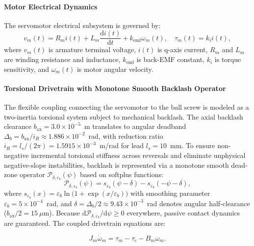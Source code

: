 \documentclass[a4paper,fleqn]{cas-dc}
\begin{document}
\paragraph{Motor Electrical Dynamics}
The servomotor electrical subsystem is governed by:
\begin{equation}
    v_m(t) = R_m i(t) + L_m \frac{\mathrm{d}i(t)}{\mathrm{d}t} + k_{\mathrm{emf}} \omega_m(t), \quad \tau_m(t) = k_i i(t),
    \label{eq:elec_dynamics}
\end{equation}
where $v_m(t)$ is armature terminal voltage, $i(t)$ is q-axis current, $R_m$ and $L_m$ are winding resistance and inductance, $k_{\mathrm{emf}}$ is back-EMF constant, $k_i$ is torque sensitivity, and $\omega_m(t)$ is motor angular velocity.

\paragraph{Torsional Drivetrain with Monotone Smooth Backlash Operator}
The flexible coupling connecting the servomotor to the ball screw is modeled as a two-inertia torsional system subject to mechanical backlash. The axial backlash clearance $b_{\mathrm{ax}} = 3.0 \times 10^{-5}$~m translates to angular deadband $\Delta_b = b_{\mathrm{ax}} / i_R \approx 1.886 \times 10^{-2}$~rad, with reduction ratio $i_R = l_s / (2\pi) = 1.5915 \times 10^{-3}$~m/rad for lead $l_s = 10$~mm. To ensure non-negative incremental torsional stiffness across reversals and eliminate unphysical negative-slope instabilities, backlash is represented via a monotone smooth dead-zone operator $\mathcal{P}_{\delta,\varepsilon_b}(\psi)$ based on softplus functions:
\begin{equation}
    \mathcal{P}_{\delta,\varepsilon_b}(\psi) = s_{\varepsilon_b}(\psi - \delta) - s_{\varepsilon_b}(-\psi - \delta),
    \label{eq:backlash_softplus}
\end{equation}
where $s_{\varepsilon_b}(x) = \varepsilon_b \ln\bigl(1 + \exp(x / \varepsilon_b)\bigr)$ with smoothing parameter $\varepsilon_b = 5 \times 10^{-4}$~rad, and $\delta = \Delta_b / 2 \approx 9.43 \times 10^{-3}$~rad denotes angular half-clearance ($b_{\mathrm{ax}} / 2 = 15~\mu\mathrm{m}$). Because $\mathrm{d}\mathcal{P}_{\delta,\varepsilon_b} / \mathrm{d}\psi \ge 0$ everywhere, passive contact dynamics are guaranteed. The coupled drivetrain equations are:

\begin{equation}
\label{eq:tor_motor}
J_m\dot{\omega}_m
= \tau_m-\tau_c-B_m\omega_m.
\end{equation}
\end{document}
